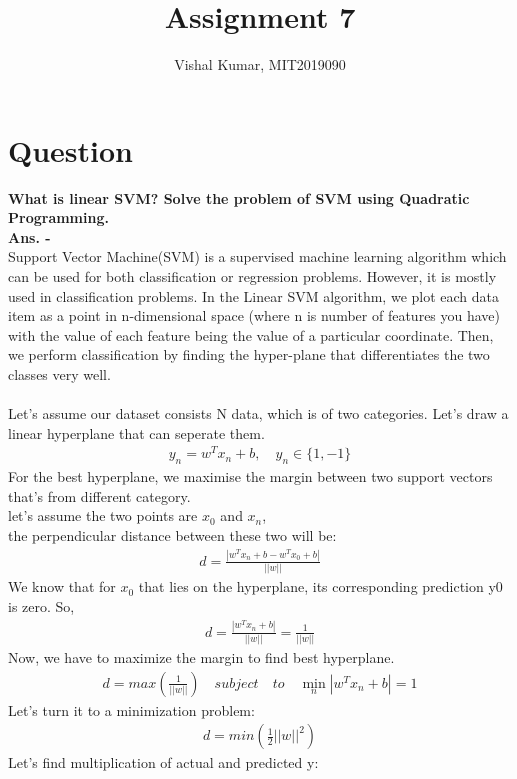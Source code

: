 \documentclass[fleqn]{article}
\title{Assignment 7}
\author{Vishal Kumar, MIT2019090}
\date{}
\begin{document}
\maketitle
\section*{Question}
{\bf What is linear SVM? Solve the problem of SVM using Quadratic Programming.}
\\
{\bf Ans. -}
\\
Support Vector Machine(SVM) is a supervised machine learning algorithm which can be used for both classification or regression problems. However, it is mostly used in classification problems. In the Linear SVM algorithm, we plot each data item as a point in n-dimensional space (where n is number of features you have) with the value of each feature being the value of a particular coordinate. Then, we perform classification by finding the hyper-plane that differentiates the two classes very well.
\\
\\
Let's assume our dataset consists N data, which is of two categories. Let's draw a linear hyperplane that can seperate them.
\begin{align*}
y_{n} = w^{T}x_{n} + b,\quad y_{n} \in \{1, -1\}
\end{align*}
For the best hyperplane, we maximise the margin between two support vectors that's from different category.
\\
let's assume the two points are $x_{0}$ and $x_{n}$, 
\\
the perpendicular distance between these two will be:
\begin{align*}
    d = \frac{|w^{T}x_{n} + b - w^{T}x_{0} + b|}{||w||}
\end{align*}
We know that for $x_{0}$ that lies on the hyperplane, its corresponding prediction y0 is zero. So,
\begin{align*}
    d = \frac{|w^{T}x_{n} + b |}{||w||} = \frac{1}{||w||}
\end{align*}
Now, we have to maximize the margin to find best hyperplane.
\begin{align*}
    d = max(\frac{1}{||w||})\quad subject\quad to\quad \min_{n} |w^{T}x_{n} + b| = 1
\end{align*}
Let's turn it to a minimization problem:
\begin{align*}
    d = min(\frac{1}{2} ||w||^{2})
\end{align*}
Let's find multiplication of actual and predicted y:
\end{document}
